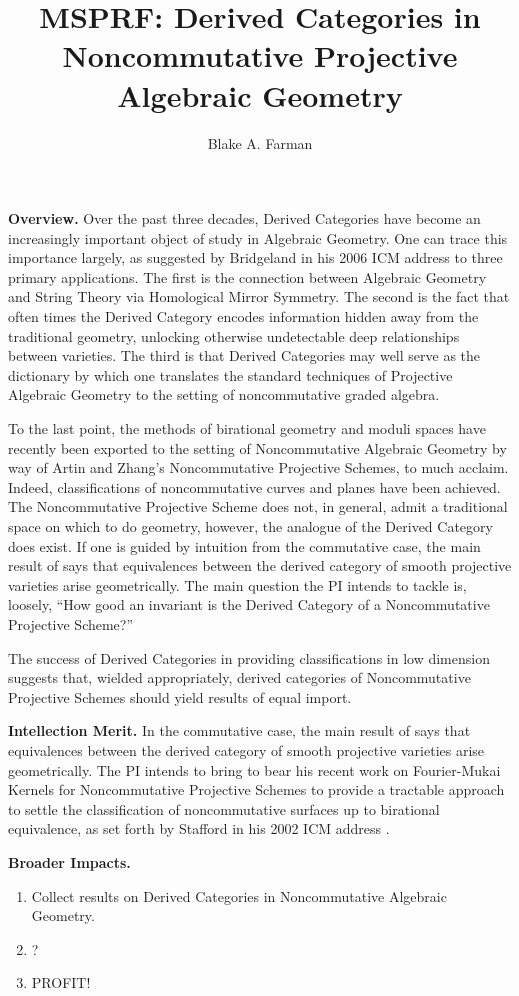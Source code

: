 \documentclass[11pt]{article}
\title{MSPRF: Derived Categories in Noncommutative Projective Algebraic Geometry}
\author{Blake A. Farman}
\date{}
\begin{document}
\maketitle

\noindent\textbf{Overview.}
Over the past three decades, Derived Categories have become an increasingly important object of study in Algebraic Geometry.
One can trace this importance largely, as suggested by Bridgeland in his 2006 ICM address \cite{Bridgeland06} to three primary applications.
The first is the connection between Algebraic Geometry and String Theory via Homological Mirror Symmetry.
The second is the fact that often times the Derived Category encodes information hidden away from the traditional geometry, unlocking otherwise undetectable deep relationships between varieties.
The third is that Derived Categories may well serve as the dictionary by which one translates the standard techniques of Projective Algebraic Geometry to the setting of noncommutative graded algebra.

To the last point, the methods of birational geometry and moduli spaces have recently been exported to the setting of Noncommutative Algebraic Geometry by way of Artin and Zhang's Noncommutative Projective Schemes, to much acclaim.
Indeed, classifications of noncommutative curves and planes have been achieved.
The Noncommutative Projective Scheme does not, in general, admit a traditional space on which to do geometry, however, the analogue of the Derived Category does exist.
If one is guided by intuition from the commutative case, the main result of \cite{Orlov1997} says that equivalences between the derived category of smooth projective varieties arise geometrically.
The main question the PI intends to tackle is, loosely, ``How good an invariant is the Derived Category of a Noncommutative Projective Scheme?''

The success of Derived Categories in providing classifications in low dimension suggests that, wielded appropriately, derived categories of Noncommutative Projective Schemes should yield results of equal import.

\noindent\textbf{Intellection Merit.}
In the commutative case, the main result of \cite{Orlov1997} says that equivalences between the derived category of smooth projective varieties arise geometrically.
The PI intends to bring to bear his recent work on Fourier-Mukai Kernels for Noncommutative Projective Schemes to provide a tractable approach to settle the classification of noncommutative surfaces up to birational equivalence, as set forth by Stafford in his 2002 ICM address \cite{Stafford02}.

\noindent\textbf{Broader Impacts.}
\begin{enumerate}[Step 1.]
\item
  Collect results on Derived Categories in Noncommutative Algebraic Geometry.
\item
  ?
\item
  PROFIT!
\end{enumerate}
\newpage


\end{document}
